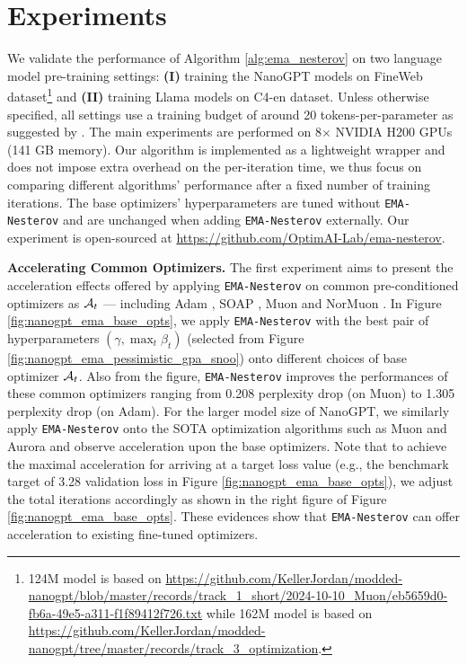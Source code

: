 \documentclass{article}
\theoremstyle{plain}
\theoremstyle{definition}
\theoremstyle{remark}
\def\algname{{\tt EMA-Nesterov}}
\begin{document}
\vspace{-0.5\baselineskip}
\section{Experiments} \label{sec:exp}
\vspace{-0.5\baselineskip}
We validate the performance of Algorithm \ref{alg:ema_nesterov} on two language model pre-training settings: {\bf (I)} training the NanoGPT models on FineWeb dataset\footnote{124M model is based on \url{https://github.com/KellerJordan/modded-nanogpt/blob/master/records/track_1_short/2024-10-10_Muon/eb5659d0-fb6a-49e5-a311-f1f89412f726.txt} while 162M model is based on \url{https://github.com/KellerJordan/modded-nanogpt/tree/master/records/track_3_optimization}.} and {\bf (II)} training Llama models on C4-en dataset. Unless otherwise specified, all settings use a training budget of around 20 tokens-per-parameter as suggested by \cite{hoffmann2022training}. The main experiments are performed on 8$\times$ NVIDIA H200 GPUs (141 GB memory). Our algorithm is implemented as a lightweight wrapper and does not impose extra overhead on the per-iteration time, we thus focus on comparing different algorithms' performance after a fixed number of training iterations. The base optimizers' hyperparameters are tuned without {\algname} and are unchanged when adding {\algname} externally. 
Our experiment is open-sourced at \url{https://github.com/OptimAI-Lab/ema-nesterov}.


\textbf{Accelerating Common Optimizers.}
The first experiment aims to present the acceleration effects offered by applying {\algname} on common pre-conditioned optimizers as ${\cal A}_t$ --- including Adam \citep{kingma2014adam}, SOAP \citep{vyas2024soap}, Muon \citep{jordan2024muon} and NorMuon \citep{li2025normuon}. 
In Figure \ref{fig:nanogpt_ema_base_opts}, we apply {\algname} with the best pair of hyperparameters $(\gamma, \max_t \beta_t)$ (selected from Figure \ref{fig:nanogpt_ema_pessimistic_gpa_snoo}) onto different choices of base optimizer ${\cal A}_t$. 
Also from the figure, {\algname} improves the performances of these common optimizers ranging from 0.208 perplexity drop (on Muon) to 1.305 perplexity drop (on Adam).
For the larger model size of NanoGPT, we similarly apply {\algname} onto the SOTA optimization algorithms such as Muon and Aurora \citep{dewulf2026aurora} and observe acceleration upon the base optimizers. Note that to achieve the maximal acceleration for arriving at a target loss value (e.g., the benchmark target of 3.28 validation loss in Figure \ref{fig:nanogpt_ema_base_opts}), we adjust the total iterations accordingly as shown in the right figure of Figure \ref{fig:nanogpt_ema_base_opts}.
These evidences show that {\algname} can offer acceleration to existing fine-tuned optimizers. 
\end{document}
